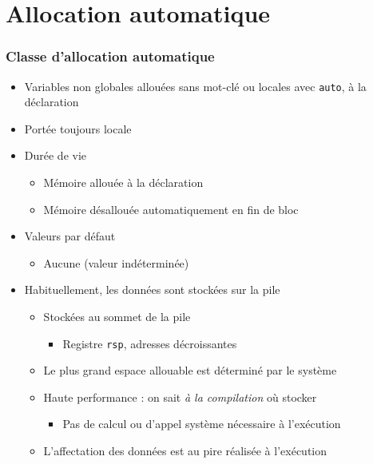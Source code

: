 \section{Allocation automatique}

\begin{frame}
\frametitle{Classe d'allocation automatique}
\begin{itemize}[<+->]
\item Variables non globales allouées sans mot-clé ou locales avec \lstinline|auto|, à la déclaration
\item Portée toujours locale
\item Durée de vie
	\begin{itemize}
	\item Mémoire allouée à la déclaration
	\item Mémoire désallouée automatiquement en fin de bloc
	\end{itemize}
\item Valeurs par défaut
	\begin{itemize}
	\item Aucune (valeur indéterminée)
	\end{itemize}
\item Habituellement, les données sont stockées sur la pile
	\begin{itemize}
	\item Stockées au sommet de la pile 
		\begin{itemize}
		\item Registre \texttt{rsp}, adresses décroissantes
		\end{itemize}
	\item Le plus grand espace allouable est déterminé par le système
	\item Haute performance : on sait \emph{à la compilation} où stocker
		\begin{itemize}
		\item Pas de calcul ou d'appel système nécessaire à l'exécution
		\end{itemize}
	\item L'affectation des données est au pire réalisée à l'exécution
	\end{itemize}
\end{itemize}
\end{frame}

